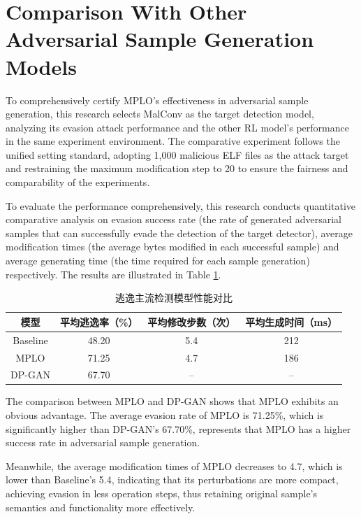 \section{Comparison With Other Adversarial Sample Generation Models}

To comprehensively certify MPLO's effectiveness in adversarial sample generation, this research selects MalConv\cite{raff2017malware} as the target detection model, analyzing its evasion attack performance and the other RL model's performance in the same experiment environment. The comparative experiment follows the unified setting standard, adopting 1,000 malicious ELF files as the attack target and restraining the maximum modification step to 20 to ensure the fairness and comparability of the experiments.

To evaluate the performance comprehensively, this research conducts quantitative comparative analysis on evasion success rate (the rate of generated adversarial samples that can successfully evade the detection of the target detector), average modification times (the average bytes modified in each successful sample) and average generating time (the time required for each sample generation) respectively. The results are illustrated in Table \ref{tab:5.10}.

\begin{table}[htbp]
	\centering
	\caption{逃逸主流检测模型性能对比}
	\label{tab:5.10}
	\begin{tabular*}{0.9\textwidth}{@{\extracolsep{\fill}}cccc}
		\toprule
		模型 & 平均逃逸率（\%） & 平均修改步数（次） & 平均生成时间（ms） \\
		\midrule
		Baseline & 48.20 & 5.4 & 212 \\
		MPLO & 71.25 & 4.7 & 186 \\
		DP-GAN & 67.70 & -- & -- \\
		\bottomrule
	\end{tabular*}
\end{table}

The comparison between MPLO and DP-GAN shows that MPLO exhibits an obvious advantage. The average evasion rate of MPLO is 71.25\%, which is significantly higher than DP-GAN's 67.70\%, represents that MPLO has a higher success rate in adversarial sample generation.

Meanwhile, the average modification times of MPLO decreases to 4.7, which is lower than Baseline's 5.4, indicating that its perturbations are more compact, achieving evasion in less operation steps, thus retaining original sample's semantics and functionality more effectively.

